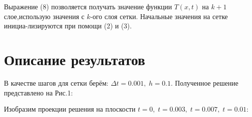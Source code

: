 \documentclass[a4paper,fontsize=14pt]{article}
\begin{document}
	Выражение (8) позволяется получать значение функции $T(x, t)$ на $k+1$ слое,использую значения с $k$-ого слоя сетки. Начальные значения на сетке инициа-лизируются при помощи (2) и (3).
	
	
	\section{Описание результатов}
	
	В качестве шагов для сетки берём: $\Delta t = 0.001, \; h = 0.1$. Полученное решение представлено на Рис.1: \\
	
	\begin{figure}[h]
		\label{pic1}
		\caption{}
	\end{figure}
	
	\newpage
	
	Изобразим проекции решения на плоскости $t=0, \; t=0.003, \; t=0.007, \; t=0.01$:
	
	\begin{figure}[h]
		\label{pic2}
		\caption{}
	\end{figure}
	
\end{document}
